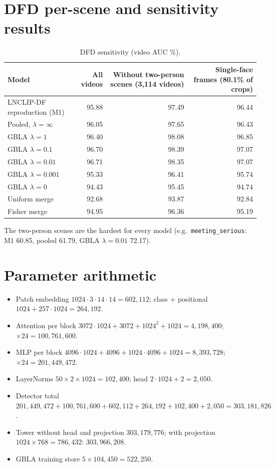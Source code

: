 \documentclass[10pt,a4paper]{article}
\begin{document}
\section{DFD per-scene and sensitivity results}
\begin{table}[H]\centering\small
\caption{DFD sensitivity (video AUC \%).}
\begin{tabularx}{\linewidth}{@{}lRRR@{}}
\toprule
Model & All videos & Without two-person scenes (3,114 videos) & Single-face frames (80.1\% of crops)\\
\midrule
LNCLIP-DF reproduction (M1) & 95.88 & 97.49 & 96.44\\
Pooled, \(\lambda=\infty\) & 96.05 & 97.65 & 96.43\\
GBLA \(\lambda=1\) & 96.40 & 98.08 & 96.85\\
GBLA \(\lambda=0.1\) & 96.70 & 98.39 & 97.07\\
GBLA \(\lambda=0.01\) & 96.71 & 98.35 & 97.07\\
GBLA \(\lambda=0.001\) & 95.33 & 96.41 & 95.74\\
GBLA \(\lambda=0\) & 94.43 & 95.45 & 94.74\\
Uniform merge & 92.68 & 93.87 & 92.84\\
Fisher merge & 94.95 & 96.36 & 95.19\\
\bottomrule
\end{tabularx}
\end{table}
The two-person scenes are the hardest for every model (e.g.\ \texttt{meeting\_serious}: M1 60.85,
pooled 61.79, GBLA \(\lambda=0.01\) 72.17).

\section{Parameter arithmetic}
\begin{itemize}
\item Patch embedding \(1024\cdot3\cdot14\cdot14=602{,}112\); class + positional \(1024+257\cdot1024=264{,}192\).
\item Attention per block \(3072\cdot1024+3072+1024^2+1024=4{,}198{,}400\); \(\times24=100{,}761{,}600\).
\item MLP per block \(4096\cdot1024+4096+1024\cdot4096+1024=8{,}393{,}728\); \(\times24=201{,}449{,}472\).
\item LayerNorms \(50\times2\times1024=102{,}400\); head \(2\cdot1024+2=2{,}050\).
\item Detector total \(201{,}449{,}472+100{,}761{,}600+602{,}112+264{,}192+102{,}400+2{,}050=303{,}181{,}826\).
\item Tower without head and projection \(303{,}179{,}776\); with projection \(1024\times768=786{,}432\): \(303{,}966{,}208\).
\item GBLA training store \(5\times104{,}450=522{,}250\).
\end{itemize}
\end{document}
